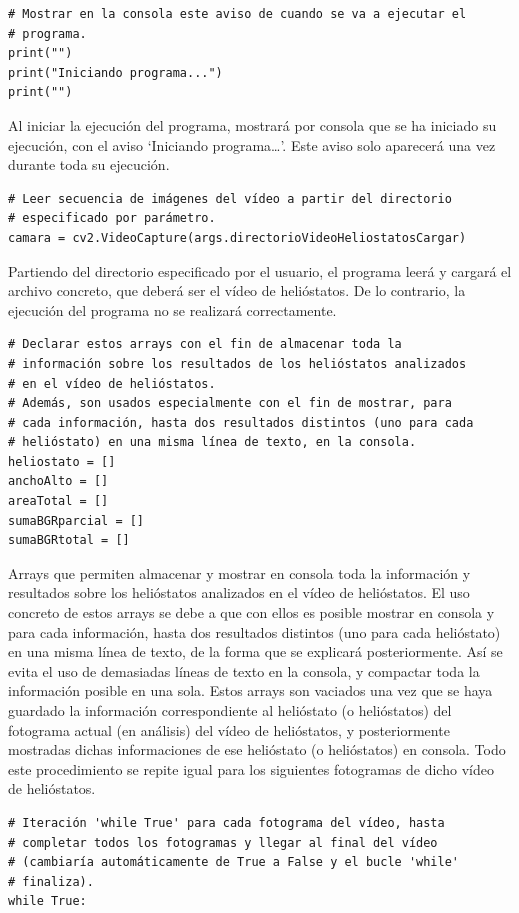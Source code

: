 \begin{lstlisting}
# Mostrar en la consola este aviso de cuando se va a ejecutar el
# programa.
print("")
print("Iniciando programa...")
print("")
\end{lstlisting}

Al iniciar la ejecución del programa, mostrará por consola que se ha iniciado su ejecución, con el aviso ‘Iniciando programa…’. Este aviso solo aparecerá una vez durante toda su ejecución.

\begin{lstlisting}
# Leer secuencia de imágenes del vídeo a partir del directorio
# especificado por parámetro.
camara = cv2.VideoCapture(args.directorioVideoHeliostatosCargar)
\end{lstlisting}

Partiendo del directorio especificado por el usuario, el programa leerá y cargará el archivo concreto, que deberá ser el vídeo de helióstatos. De lo contrario, la ejecución del programa no se realizará correctamente.

\begin{lstlisting}
# Declarar estos arrays con el fin de almacenar toda la
# información sobre los resultados de los helióstatos analizados
# en el vídeo de helióstatos.
# Además, son usados especialmente con el fin de mostrar, para
# cada información, hasta dos resultados distintos (uno para cada
# helióstato) en una misma línea de texto, en la consola.
heliostato = []
anchoAlto = []
areaTotal = []
sumaBGRparcial = []
sumaBGRtotal = []
\end{lstlisting}

Arrays que permiten almacenar y mostrar en consola toda la información y resultados sobre los helióstatos analizados en el vídeo de helióstatos. El uso concreto de estos arrays se debe a que con ellos es posible mostrar en consola y para cada información, hasta dos resultados distintos (uno para cada helióstato) en una misma línea de texto, de la forma que se explicará posteriormente. Así se evita el uso de demasiadas líneas de texto en la consola, y compactar toda la información posible en una sola. Estos arrays son vaciados una vez que se haya guardado la información correspondiente al helióstato (o helióstatos) del fotograma actual (en análisis) del vídeo de helióstatos, y posteriormente mostradas dichas informaciones de ese helióstato (o helióstatos) en consola. Todo este procedimiento se repite igual para los siguientes fotogramas de dicho vídeo de helióstatos.

\begin{lstlisting}
# Iteración 'while True' para cada fotograma del vídeo, hasta
# completar todos los fotogramas y llegar al final del vídeo
# (cambiaría automáticamente de True a False y el bucle 'while'
# finaliza).
while True:
\end{lstlisting}

